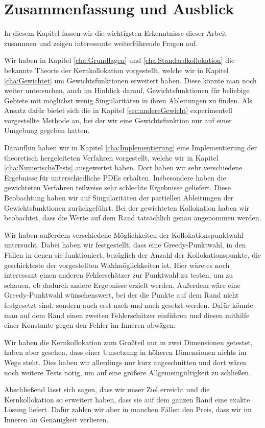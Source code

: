 \chapter{Zusammenfassung und Ausblick}
\label{cha:schluss}

In diesem Kapitel fassen wir die wichtigsten Erkenntnisse dieser Arbeit zusammen und zeigen interessante weiterführende Fragen auf.

Wir haben in Kapitel \ref{cha:Grundlagen} und \ref{cha:Standardkollokation} die bekannte Theorie der Kernkollokation vorgestellt, welche wir in Kapitel \ref{cha:Gewichtet} um Gewichtsfunktionen erweitert haben. Diese könnte man noch weiter untersuchen, auch im Hinblick darauf, Gewichtsfunktionen für beliebige Gebiete mit möglichst wenig Singularitäten in ihren Ableitungen zu finden. Als Ansatz dafür bietet sich die in Kapitel \ref{sec:andereGewicht} experimentell vorgestellte Methode an, bei der wir eine Gewichtsfunktion nur auf einer Umgebung gegeben hatten.

Daraufhin haben wir in Kapitel \ref{cha:Implementierung} eine Implementierung der theoretisch hergeleiteten Verfahren vorgestellt, welche wir in Kapitel \ref{cha:NumerischeTests} ausgewertet haben. Dort haben wir sehr verschiedene Ergebnisse für unterschiedliche \acp{PDE} erhalten. Insbesondere haben die gewichteten Verfahren teilweise sehr schlechte Ergebnisse geliefert. Diese Beobachtung haben wir auf Singularitäten der partiellen Ableitungen der Gewichtsfunktionen zurückgeführt. Bei der gewichteten Kollokation haben wir beobachtet, dass die Werte auf dem Rand tatsächlich genau angenommen werden.

Wir haben außerdem verschiedene Möglichkeiten der Kollokationspunktwahl untersucht. Dabei haben wir festgestellt, dass eine Greedy-Punktwahl, in den Fällen in denen sie funktioniert, bezüglich der Anzahl der Kollokationspunkte, die geschickteste der vorgestellten Wahlmöglichkeiten ist. Hier wäre es noch interessant einen anderen Fehlerschätzer zur Punktwahl zu testen, um zu schauen, ob dadurch andere Ergebnisse erzielt werden. Außerdem wäre eine Greedy-Punktwahl wünschenswert, bei der die Punkte auf dem Rand nicht festgesetzt sind, sondern auch erst nach und nach gesetzt werden. Dafür könnte man auf dem Rand einen zweiten Fehlerschätzer einführen und diesen mithilfe einer Konstante gegen den Fehler im Inneren abwägen.

Wir haben die Kernkollokation zum Großteil nur in zwei Dimensionen getestet, haben aber gesehen, dass einer Umsetzung in höheren Dimensionen nichts im Wege steht. Dies haben wir allerdings nur kurz angeschnitten und dort wären noch weitere Tests nötig, um auf eine größere Allgemeingültigkeit zu schließen.

Abschließend lässt sich sagen, dass wir unser Ziel erreicht und die Kernkollokation so erweitert haben, dass sie auf dem ganzen Rand eine exakte Lösung liefert. Dafür zahlen wir aber in manchen Fällen den Preis, dass wir im Inneren an Genauigkeit verlieren.